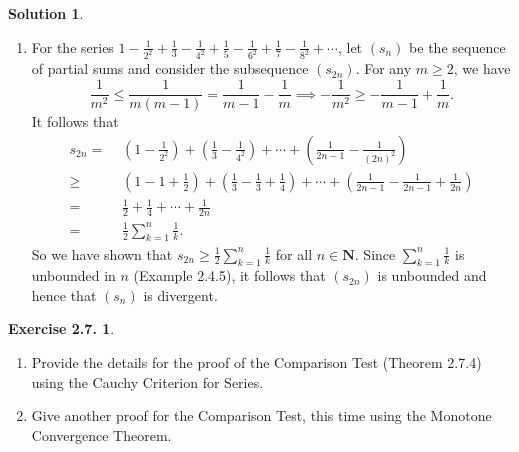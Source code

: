 \documentclass[12pt]{article}
\theoremstyle{definition}
\theoremstyle{exercise}
\newtheorem{exercise}{Exercise 2.7.}
\theoremstyle{solution}
\newtheorem*{solution}{Solution}
\newcommand{\N}{\mathbf{N}}
\begin{document}
\begin{solution}
\begin{enumerate}
        \item For the series \( 1 - \tfrac{1}{2^2} + \tfrac{1}{3} - \tfrac{1}{4^2} + \tfrac{1}{5} - \tfrac{1}{6^2} + \tfrac{1}{7} - \tfrac{1}{8^2} + \cdots \), let \( (s_n) \) be the sequence of partial sums and consider the subsequence \( (s_{2n}) \). For any \( m \geq 2 \), we have
        \[
            \frac{1}{m^2} \leq \frac{1}{m(m-1)} = \frac{1}{m-1} - \frac{1}{m} \implies -\frac{1}{m^2} \geq - \frac{1}{m-1} + \frac{1}{m}.
        \]
        It follows that
        \begin{align*}
            s_{2n} = \,\, & \left( 1 - \frac{1}{2^2} \right) + \left( \frac{1}{3} - \frac{1}{4^2} \right) + \cdots + \left( \frac{1}{2n - 1} - \frac{1}{(2n)^2} \right) \\[2mm]
            \geq \,\, & \left( 1 - 1 + \frac{1}{2} \right) + \left( \frac{1}{3} - \frac{1}{3} + \frac{1}{4} \right) + \cdots + \left( \frac{1}{2n-1} - \frac{1}{2n-1} + \frac{1}{2n} \right) \\[2mm]
            = \,\, & \frac{1}{2} + \frac{1}{4} + \cdots + \frac{1}{2n} \\[2mm]
            = \,\, & \frac{1}{2} \sum_{k=1}^n \frac{1}{k}.
        \end{align*}
        So we have shown that \( s_{2n} \geq \tfrac{1}{2} \sum_{k=1}^n \tfrac{1}{k} \) for all \( n \in \N \). Since \( \sum_{k=1}^n \tfrac{1}{k} \) is unbounded in \( n \) (Example 2.4.5), it follows that \( (s_{2n}) \) is unbounded and hence that \( (s_n) \) is divergent.
    \end{enumerate}
\end{solution}

\begin{exercise}
\label{ex:3}
    \begin{enumerate}
        \item Provide the details for the proof of the Comparison Test (Theorem 2.7.4) using the Cauchy Criterion for Series.

        \item Give another proof for the Comparison Test, this time using the Monotone Convergence Theorem.
    \end{enumerate}
\end{exercise}
\end{document}
